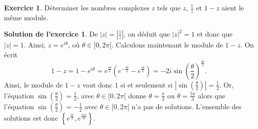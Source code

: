\documentclass[a4paper, 11pt,openany]{article}%
\theoremstyle{plain}
\theoremstyle{definition}
\newtheorem{exo}{Exercice}
\newtheorem{sol}{Solution de l'exercice}
\theoremstyle{remark}
\begin{document}
\begin{exo}
Déterminer les nombres complexes $z$ tels que $z$, $\frac{1}{z}$ et $1-z$ aient le même module.
\end{exo}

\begin{sol}
De $|z|= \left| \frac{1}{z} \right|$, on déduit que $|z|^2=1$ et donc que $|z|=1$. Ainsi, $z=e^{i\theta}$, où $\theta \in [0,2\pi [$. Calculons maintenant le module de $1-z$. On écrit 
\[ 1-z= 1-e^{i\theta} = e^{\frac{i \theta}{2}}(e^{-\frac{i \theta}{2}}- e^{\frac{i \theta}{2}})= -2i\sin \left( \frac{\theta}{2} \right) ^{\frac{i \theta}{2}}.\]
Ainsi, le module de $1-z$ vaut donc $1$ si et seulement si $\left| \sin \left( \frac{\theta}{2} \right) \right|=\frac{1}{2}$. Or, l'équation $\sin \left( \frac{\theta}{2} \right) = \frac{1}{2}$, avec $ \theta \in [0,2 \pi[$ donne $\theta = \frac{\pi}{3}$ ou $\theta = \frac{5 \pi}{3}$ alors que l'équation $\sin \left( \frac{\theta}{2} \right) = -\frac{1}{2}$ avec $\theta \in [0, 2 \pi[$ n'a pas de solutions. L'ensemble des solutions est donc $\left\{ e^{\frac{i \pi}{3}} , e^{\frac{5i \pi}{3}} \right\}$.
\end{sol}
\end{document}
